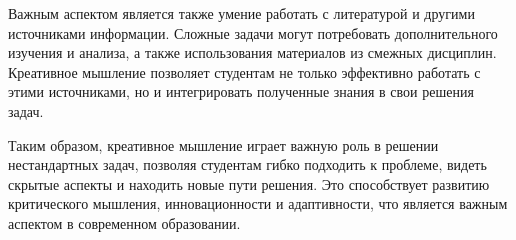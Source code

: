 Важным аспектом является также умение работать с литературой и другими источниками информации. Сложные задачи могут потребовать дополнительного изучения и анализа, а также использования материалов из смежных дисциплин. Креативное мышление позволяет студентам не только эффективно работать с этими источниками, но и интегрировать полученные знания в свои решения задач.

Таким образом, креативное мышление играет важную роль в решении нестандартных задач, позволяя студентам гибко подходить к проблеме, видеть скрытые аспекты и находить новые пути решения. Это способствует развитию критического мышления, инновационности и адаптивности, что является важным аспектом в современном образовании.
